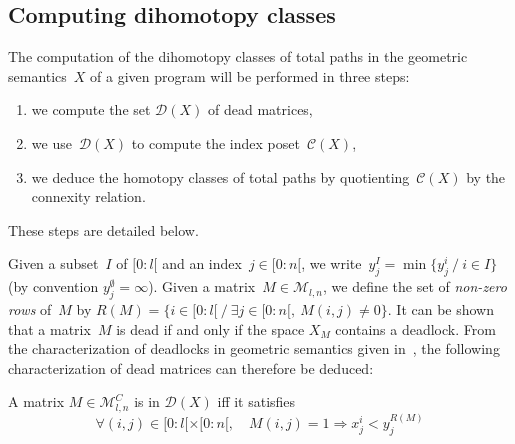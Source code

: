 \documentclass[orivec]{llncs} \usepackage[T1]{fontenc}
\newcommand\set[1]{\{#1\}}
\newcommand\setof[2]{\set{#1\ /\ #2}}
\newcommand{\Nint}[2]{[#1:#2[}
\newcommand{\C}{\mathcal{C}}
\newcommand{\Mat}{\mathcal{M}}
\newcommand{\D}{\mathcal{D}}
\renewcommand{\C}{\mathcal{C}}
\begin{document}
\subsection{Computing dihomotopy classes}
\label{sec:homotopy-classes}
\label{algo}
The computation of the dihomotopy classes of total paths in the geometric
semantics~$X$ of a given program will be performed in three steps:
\begin{enumerate}
\item we compute the set $\D(X)$ of dead matrices,
\item we use~$\D(X)$ to compute the index poset~$\C(X)$,
\item we deduce the homotopy classes of total paths by quotienting~$\C(X)$ by
  the connexity relation.
\end{enumerate}
These steps are detailed below.







Given a subset~$I$ of $\Nint 0l$ and an index~$j\in\Nint 0n$, we
write~$y^I_j=\min\setof{y^i_j}{i\in I}$ (by convention
\hbox{$y^\emptyset_j=\infty$}). Given a matrix~$M\in \Mat_{l,n}$, we define the
set of \emph{non-zero rows} of~$M$ by \hbox{$R(M)=\setof{i\in\Nint 0l}{\exists
    j\in\Nint 0n,\ M(i,j)\neq 0}$}. It can be shown that a matrix~$M$ is dead if
and only if the space $X_M$ contains a deadlock. From the characterization of
deadlocks in geometric semantics given in~\cite{fajstrup1998detecting}, the
following characterization of dead matrices can therefore be deduced:






\begin{proposition}
  A matrix $M\in \Mat_{l,n}^C$ is in $\D(X)$ iff it satisfies
  \begin{equation}
    \label{eq:dead}
    \forall (i,j)\in\Nint 0l\times\Nint 0n,
    \quad
    M(i,j)=1
    \Rightarrow
    x^i_j<y^{R(M)}_j
  \end{equation}
\end{proposition}
\end{document}

